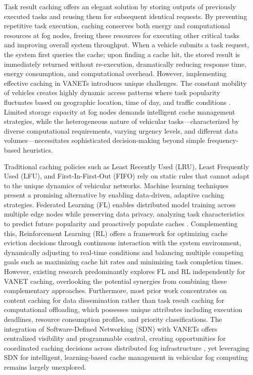 Task result caching offers an elegant solution by storing outputs of previously executed tasks and reusing them for subsequent identical requests. By preventing repetitive task execution, caching conserves both energy and computational resources at fog nodes, freeing these resources for executing other critical tasks and improving overall system throughput. When a vehicle submits a task request, the system first queries the cache; upon finding a cache hit, the stored result is immediately returned without re-execution, dramatically reducing response time, energy consumption, and computational overhead. However, implementing effective caching in VANETs introduces unique challenges. The constant mobility of vehicles creates highly dynamic access patterns where task popularity fluctuates based on geographic location, time of day, and traffic conditions \cite{domingos2016data}. Limited storage capacity at fog nodes demands intelligent cache management strategies, while the heterogeneous nature of vehicular tasks—characterized by diverse computational requirements, varying urgency levels, and different data volumes—necessitates sophisticated decision-making beyond simple frequency-based heuristics.

Traditional caching policies such as Least Recently Used (LRU), Least Frequently Used (LFU), and First-In-First-Out (FIFO) rely on static rules that cannot adapt to the unique dynamics of vehicular networks. Machine learning techniques present a promising alternative by enabling data-driven, adaptive caching strategies. Federated Learning (FL) enables distributed model training across multiple edge nodes while preserving data privacy, analyzing task characteristics to predict future popularity and proactively populate caches \cite{yu2015cooperative}. Complementing this, Reinforcement Learning (RL) offers a framework for optimizing cache eviction decisions through continuous interaction with the system environment, dynamically adjusting to real-time conditions and balancing multiple competing goals such as maximizing cache hit rates and minimizing task completion times. However, existing research predominantly explores FL and RL independently for VANET caching, overlooking the potential synergies from combining these complementary approaches. Furthermore, most prior work concentrates on content caching for data dissemination rather than task result caching for computational offloading, which possesses unique attributes including execution deadlines, resource consumption profiles, and priority classifications. The integration of Software-Defined Networking (SDN) with VANETs offers centralized visibility and programmable control, creating opportunities for coordinated caching decisions across distributed fog infrastructure \cite{misra2019soft}, yet leveraging SDN for intelligent, learning-based cache management in vehicular fog computing remains largely unexplored.

